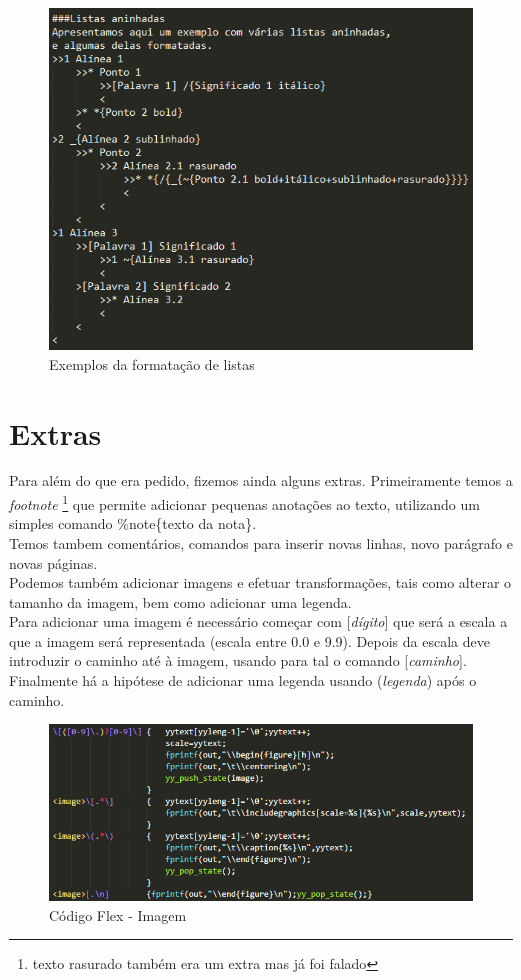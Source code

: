 \documentclass{report}
\begin{document}
\begin{figure}[h]
	\centering
	\includegraphics[scale=0.8]{listas_source.png}
	\caption{Exemplos da formatação de listas}
\end{figure}


\newpage

\section{Extras
}
Para além do que era pedido, fizemos ainda alguns extras. 
Primeiramente temos a \textit{footnote} 
\footnote{{texto rasurado também era um extra mas já foi falado}} 
que permite adicionar pequenas anotações ao texto, 
utilizando um simples comando \%note\{texto da nota\}. 
\\
Temos tambem comentários, comandos para inserir novas linhas, 
novo parágrafo e novas páginas.
\\
Podemos também adicionar imagens e efetuar transformações, 
tais como alterar o tamanho da imagem, 
bem como adicionar uma legenda.
\\
Para adicionar uma imagem é necessário começar com [\textit{dígito}] 
que será a escala a que a imagem será representada (escala entre 0.0 e 9.9). 
Depois da escala deve introduzir o caminho até à imagem, 
usando para tal o comando [\textit{caminho}]. 
Finalmente há a hipótese de adicionar uma legenda usando 
(\textit{legenda}) após o caminho.

\begin{figure}[h]
	\centering
	\includegraphics[scale=0.9]{imagem_flex.png}
	\caption{Código Flex - Imagem}
\end{figure}
\end{document}
